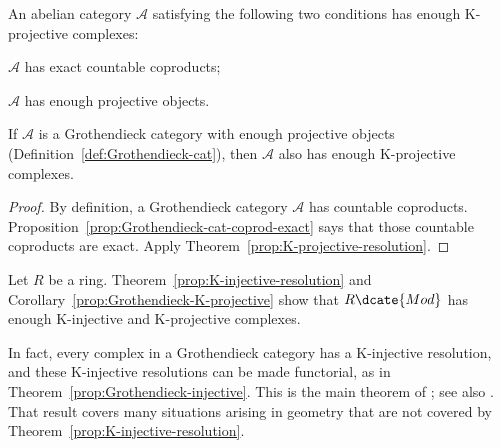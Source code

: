 \begin{theorem}\label{prop:K-projective-resolution}
	An abelian category $\mathcal{A}$ satisfying the following two
	conditions has enough K-projective complexes:
	\begin{compactitem}
		\item $\mathcal{A}$ has exact countable coproducts;
		\item $\mathcal{A}$ has enough projective objects.
	\end{compactitem}
\end{theorem}

\begin{corollary}\label{prop:Grothendieck-K-projective}
	If $\mathcal{A}$ is a Grothendieck category with enough projective
	objects (Definition~\ref{def:Grothendieck-cat}), then $\mathcal{A}$ also
	has enough K-projective complexes.
\end{corollary}

\begin{proof}
	By definition, a Grothendieck category $\mathcal{A}$ has countable
	coproducts. Proposition~\ref{prop:Grothendieck-cat-coprod-exact} says
	that those countable coproducts are exact. Apply
	Theorem~\ref{prop:K-projective-resolution}.
\end{proof}

\begin{example}\label{eg:Mod-K-injectives}
	Let $R$ be a ring. Theorem~\ref{prop:K-injective-resolution} and
	Corollary~\ref{prop:Grothendieck-K-projective} show that
	$R\dcate{Mod}$ has enough K-injective and K-projective complexes.
\end{example}

In fact, every complex in a Grothendieck category has a K-injective
resolution, and these K-injective resolutions can be made functorial, as in
Theorem~\ref{prop:Grothendieck-injective}. This is the main theorem of
\cite{Serp03}; see also \cite[Tag 079P]{stacks}. That result covers many
situations arising in geometry that are not covered by
Theorem~\ref{prop:K-injective-resolution}.
